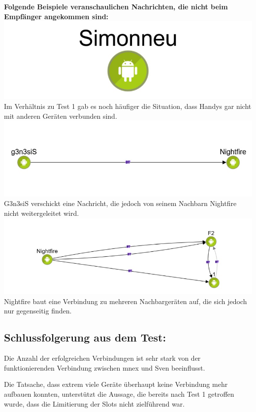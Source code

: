 \textbf{Folgende Beispiele veranschaulichen Nachrichten, die nicht beim
Empfänger angekommen sind:}
\includegraphics{belege/grosstests/Bilder/Grosstest2/Test2Misserfolg1.jpg}
Im Verhältnis zu Test 1 gab es noch häufiger die Situation, dass Handys
gar nicht mit anderen Geräten verbunden sind.
\includegraphics{belege/grosstests/Bilder/Grosstest2/Test2Misserfolg2.jpg}
G3n3siS verschickt eine Nachricht, die jedoch von seinem Nachbarn
Nightfire nicht weitergeleitet wird.
\includegraphics{belege/grosstests/Bilder/Grosstest2/Test2Misserfolg3.jpg}
Nightfire baut eine Verbindung zu mehreren Nachbargeräten auf, die sich
jedoch nur gegenseitig finden.

\clearpage\subsection{Schlussfolgerung aus dem
Test:}\label{schlussfolgerung-aus-dem-test-3}

Die Anzahl der erfolgreichen Verbindungen ist sehr stark von der
funktionierenden Verbindung zwischen mnex und Sven beeinflusst.

Die Tatsache, dass extrem viele Geräte überhaupt keine Verbindung mehr
aufbauen konnten, unterstützt die Aussage, die bereits nach Test 1
getroffen wurde, dass die Limitierung der Slots nicht zielführend war.

